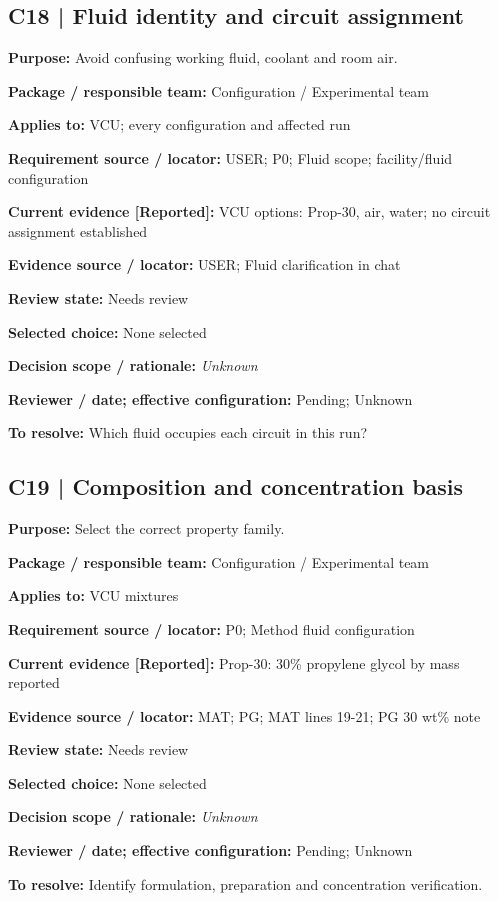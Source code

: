\documentclass[11pt]{article}
\begin{document}
\begin{minipage}{\textwidth}\small\setlength{\parskip}{2pt}
\subsection*{C18 | Fluid identity and circuit assignment}
\textbf{Purpose:} Avoid confusing working fluid, coolant and room air.\par
\textbf{Package / responsible team:} Configuration / Experimental team\par
\textbf{Applies to:} VCU; every configuration and affected run\par
\textbf{Requirement source / locator:} USER; P0; Fluid scope; facility/fluid configuration\par
\textbf{Current evidence [Reported]:} VCU options: Prop-30, air, water; no circuit assignment established\par
\textbf{Evidence source / locator:} USER; Fluid clarification in chat\par
\textbf{Review state:} Needs review\par
\textbf{Selected choice:} None selected\par
\textbf{Decision scope / rationale:} \textit{Unknown}\par
\textbf{Reviewer / date; effective configuration:} Pending; Unknown\par
\textbf{To resolve:} Which fluid occupies each circuit in this run?\par
\end{minipage}\par\vspace{5pt}
\begin{minipage}{\textwidth}\small\setlength{\parskip}{2pt}
\subsection*{C19 | Composition and concentration basis}
\textbf{Purpose:} Select the correct property family.\par
\textbf{Package / responsible team:} Configuration / Experimental team\par
\textbf{Applies to:} VCU mixtures\par
\textbf{Requirement source / locator:} P0; Method fluid configuration\par
\textbf{Current evidence [Reported]:} Prop-30: 30\% propylene glycol by mass reported\par
\textbf{Evidence source / locator:} MAT; PG; MAT lines 19-21; PG 30 wt\% note\par
\textbf{Review state:} Needs review\par
\textbf{Selected choice:} None selected\par
\textbf{Decision scope / rationale:} \textit{Unknown}\par
\textbf{Reviewer / date; effective configuration:} Pending; Unknown\par
\textbf{To resolve:} Identify formulation, preparation and concentration verification.\par
\end{minipage}\par\vspace{5pt}
\end{document}
